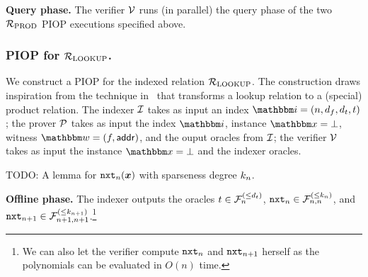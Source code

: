\textbf{Query phase.}
The verifier $\mathcal{V}$ runs (in parallel) the query phase of the two ${\mathcal{R}}_{\text{PROD}}$ PIOP 
executions specified above.

\subsubsection*{PIOP for ${\mathcal{R}}_{\text{LOOKUP}}$.} 
We construct a PIOP for the indexed relation ${\mathcal{R}}_{\text{LOOKUP}}$.
The construction draws inspiration from the technique in~\cite{GW20} that 
transforms a lookup relation to a (special) product relation.
The indexer $\mathcal{I}$ takes as input an index $\idxR = (n, d_f, d_t, t)$;
the prover $\mathcal{P}$ takes as input the index $\idxR$, instance $\instR = \bot$,
witness $\witR = (f, \addr)$, and the ouput oracles from $\mathcal{I}$;
the verifier $\mathcal{V}$ takes as input the instance $\instR = \bot$ and 
the indexer oracles.

\begin{lemma}
    TODO: A lemma for $\mathtt{nxt}_{n}(\boldsymbol{x})$ with sparseness degree $k_{n}$.
\end{lemma}

\textbf{Offline phase.}
The indexer outputs the oracles $t \in {\mathcal{F}}_{n}^{(\le{d_t})}$, $\mathtt{nxt}_{n} \in {\mathcal{F}}_{n,n}^{(\le{k_{n}})}$,
and $\mathtt{nxt}_{n+1} \in {\mathcal{F}}_{n+1,n+1}^{(\le{k_{n+1}})}$.\footnote{We can also let the verifier 
compute $\mathtt{nxt}_{n}$ and $\mathtt{nxt}_{n+1}$ herself as the polynomials can be evaluated in $O(n)$ time.}

